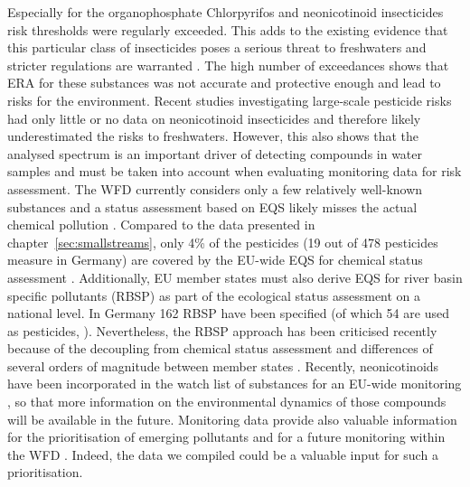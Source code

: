 Especially for the organophosphate Chlorpyrifos and neonicotinoid insecticides risk thresholds were regularly exceeded.
This adds to the existing evidence that this particular class of insecticides poses a serious threat to freshwaters and stricter regulations are warranted \citep{morrissey_neonicotinoid_2015, goulson_overview_2013}. 
The high number of exceedances shows that ERA for these substances was not accurate and protective enough and lead to risks for the environment. 
Recent studies investigating large-scale pesticide risks had only little  \citep{stehle_pesticide_2015} or no data on neonicotinoid insecticides \citep{malaj_organic_2014} and therefore likely underestimated the risks to freshwaters. 
However, this also shows that the ana\-lysed spectrum is an important driver of detecting compounds in water samples \citep{schreiner_pesticide_2016, malaj_organic_2014} and must be taken into account when evaluating monitoring data for risk assessment. 
The WFD currently considers only a few relatively well-known substances \citep{european_union_directive_2013} and a status assessment based on EQS likely misses the actual chemical pollution \citep{moschet_how_2014}. 
Compared to the data presented in chapter~\ref{sec:smallstreams}, only 4\% of the pesticides (19 out of 478 pesticides measure in Germany) are covered by the EU-wide EQS for chemical status assessment \citep{european_union_directive_2013}. 
Additionally, EU member states must also derive EQS for river basin specific pollutants (RBSP) as part of the ecological status assessment on a national level. 
In Germany 162 RBSP have been specified (of which 54 are used as pesticides, \citet{arle_monitoring_2016, umweltbundesamt_water_2013}). 
Nevertheless, the RBSP approach has been criticised recently because of the decoupling from chemical status assessment and differences of several orders of
magnitude between member states \citep{brack_towards_2017}.
Recently, neonicotinoids have been incorporated in the watch list of substances for an EU-wide monitoring \citep{european_union_commission_2015}, so that more information on the environmental dynamics of those compounds will be available in the future. 
Monitoring data provide also valuable information for the prioritisation of emerging pollutants and for a future monitoring within the WFD \citep{brack_towards_2017}.
Indeed, the data we compiled could be a valuable input for such a prioritisation. 

